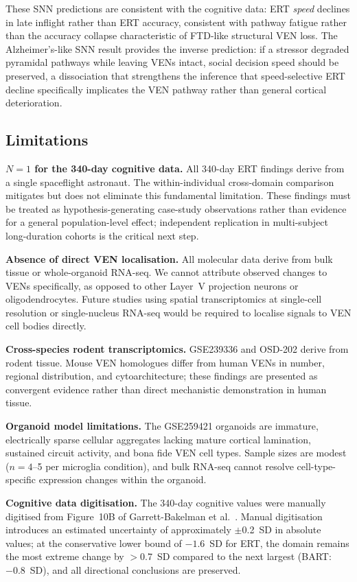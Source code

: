 \documentclass[11pt]{article}
\begin{document}
These SNN predictions are consistent with the cognitive data: ERT
\emph{speed} declines in late inflight rather than ERT accuracy, consistent
with pathway fatigue rather than the accuracy collapse characteristic of
FTD-like structural VEN loss.
The Alzheimer's-like SNN result provides the inverse prediction: if a
stressor degraded pyramidal pathways while leaving VENs intact, social
decision speed should be preserved, a dissociation that strengthens the
inference that speed-selective ERT decline specifically implicates the VEN
pathway rather than general cortical deterioration.

\subsection{Limitations}

\textbf{$N=1$ for the 340-day cognitive data.}
All 340-day ERT findings derive from a single spaceflight astronaut.
The within-individual cross-domain comparison mitigates but does not
eliminate this fundamental limitation.
These findings must be treated as hypothesis-generating case-study
observations rather than evidence for a general population-level effect;
independent replication in multi-subject long-duration cohorts is the
critical next step.

\textbf{Absence of direct VEN localisation.}
All molecular data derive from bulk tissue or whole-organoid RNA-seq.
We cannot attribute observed changes to VENs specifically, as opposed to
other Layer~V projection neurons or oligodendrocytes.
Future studies using spatial transcriptomics at single-cell resolution or
single-nucleus RNA-seq would be required to localise signals to VEN cell
bodies directly.

\textbf{Cross-species rodent transcriptomics.}
GSE239336 and OSD-202 derive from rodent tissue.
Mouse VEN homologues differ from human VENs in number, regional
distribution, and cytoarchitecture; these findings are presented as
convergent evidence rather than direct mechanistic demonstration in
human tissue.

\textbf{Organoid model limitations.}
The GSE259421 organoids are immature, electrically sparse cellular
aggregates lacking mature cortical lamination, sustained circuit activity,
and bona fide VEN cell types.
Sample sizes are modest ($n=4$--5 per microglia condition), and bulk
RNA-seq cannot resolve cell-type-specific expression changes within the
organoid.

\textbf{Cognitive data digitisation.}
The 340-day cognitive values were manually digitised from Figure~10B
of Garrett-Bakelman et al.~\cite{garrett2019}.
Manual digitisation introduces an estimated uncertainty of approximately
$\pm$0.2~SD in absolute values; at the conservative lower bound of
$-1.6$~SD for ERT, the domain remains the most extreme change by
$>$0.7~SD compared to the next largest (BART: $-0.8$~SD), and all
directional conclusions are preserved.
\end{document}
